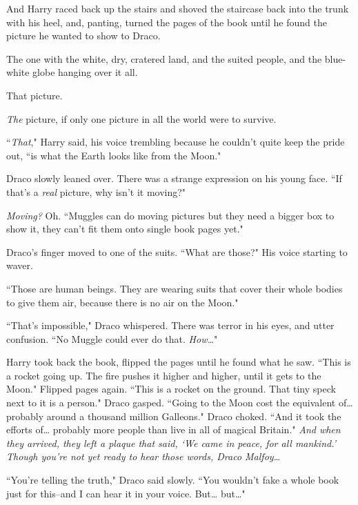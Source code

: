 And Harry raced back up the stairs and shoved the staircase back into the trunk with his heel, and, panting, turned the pages of the book until he found the picture he wanted to show to Draco.

The one with the white, dry, cratered land, and the suited people, and the blue-white globe hanging over it all.

That picture.

\emph{The} picture, if only one picture in all the world were to survive.

``\emph{That}," Harry said, his voice trembling because he couldn't quite keep the pride out, ``is what the Earth looks like from the Moon."

Draco slowly leaned over. There was a strange expression on his young face. ``If that's a \emph{real} picture, why isn't it moving?"

\emph{Moving?} Oh. ``Muggles can do moving pictures but they need a bigger box to show it, they can't fit them onto single book pages yet."

Draco's finger moved to one of the suits. ``What are those?" His voice starting to waver.

``Those are human beings. They are wearing suits that cover their whole bodies to give them air, because there is no air on the Moon."

``That's impossible," Draco whispered. There was terror in his eyes, and utter confusion. ``No Muggle could ever do that. \emph{How{\ldots}}"

Harry took back the book, flipped the pages until he found what he saw. ``This is a rocket going up. The fire pushes it higher and higher, until it gets to the Moon." Flipped pages again. ``This is a rocket on the ground. That tiny speck next to it is a person." Draco gasped. ``Going to the Moon cost the equivalent of{\ldots} probably around a thousand million Galleons." Draco choked. ``And it took the efforts of{\ldots} probably more people than live in all of magical Britain." \emph{And when they arrived, they left a plaque that said, `We came in peace, for all mankind.' Though you're not yet ready to hear those words, Draco Malfoy{\ldots}}

``You're telling the truth," Draco said slowly. ``You wouldn't fake a whole book just for this\---and I can hear it in your voice. But{\ldots} but{\ldots}"

